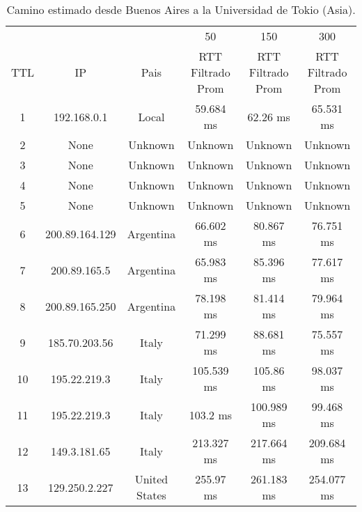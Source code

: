 
\begin{table}[]
\centering
\caption{Camino estimado desde Buenos Aires a la Universidad de Tokio (Asia).}
\begin{tabular}{ | c | c | c | c | c | c | }
\hline
 &&& 50 & 150 & 300 \\ %
TTL	&         IP     &    	        Pais     &   	 RTT Filtrado Prom & 	 RTT Filtrado Prom  &	 RTT Filtrado Prom \\ \hline  
1	&192.168.0.1     &    	       Local     &   	      59.684 ms    & 	       62.26 ms     &	      65.531 ms  \\ \hline    
2	&None            &    	      Unknown    &   	      Unknown      & 	      Unknown       &	      Unknown    \\ \hline    
3	&None            &    	      Unknown    &   	      Unknown      & 	      Unknown       &	      Unknown    \\ \hline    
4	&None            &    	      Unknown    &   	      Unknown      & 	      Unknown       &	      Unknown    \\ \hline    
5	&None            &    	      Unknown    &   	      Unknown      & 	      Unknown       &	      Unknown    \\ \hline    
6	&200.89.164.129  &    	     Argentina   &   	      66.602 ms    & 	      80.867 ms     &	      76.751 ms  \\ \hline    
7	&200.89.165.5    &    	     Argentina   &   	      65.983 ms    & 	      85.396 ms     &	      77.617 ms  \\ \hline    
8	&200.89.165.250  &    	     Argentina   &   	      78.198 ms    & 	      81.414 ms     &	      79.964 ms  \\ \hline    
9	&185.70.203.56   &    	       Italy     &   	      71.299 ms    & 	      88.681 ms     &	      75.557 ms  \\ \hline    
10	&195.22.219.3    &    	       Italy     &   	     105.539 ms    & 	      105.86 ms     &	      98.037 ms  \\ \hline    
11	&195.22.219.3    &    	       Italy     &   	       103.2 ms    & 	     100.989 ms     &	      99.468 ms  \\ \hline    
12	&149.3.181.65    &    	       Italy     &   	     213.327 ms    & 	     217.664 ms     &	     209.684 ms  \\ \hline    
13	&129.250.2.227   &    	   United States &   	      255.97 ms    & 	     261.183 ms     &	     254.077 ms  \\ \hline    

\end{tabular}
\end{table}
